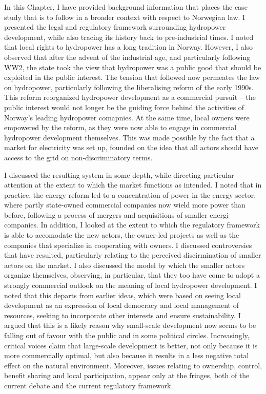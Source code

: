 In this Chapter, I have provided background information that places the case study that is to follow in a broader context with respect to Norwegian law. I presented the legal and regulatory framework surrounding hydropower development, while also tracing its history back to pre-industrial times. I noted that local rights to hydropower has a long tradition in Norway. However, I also observed that after the advent of the industrial age, and particularly following WW2, the state took the view that hydropower was a public good that should be exploited in the public interest. The tension that followed now permeates the law on hydropower, particularly following the liberalising reform of the early 1990s. This reform reorganized hydropower development as a commercial pursuit -- the public interest would not longer be the guiding force behind the activities of Norway's leading hydropower comapnies. At the same time, local owners were empowered by the reform, as they were now able to engage in commercial hydropower development themselves. This was made possible by the fact that a market for electricity was set up, founded on the idea that all actors should have access to the grid on non-discriminatory terms. 

I discussed the resulting system in some depth, while directing particular attention at the extent to which the market functions as intended. I noted that in practice, the energy reform led to a concentration of power in the energy sector, where partly state-owned commercial companies now wield more power than before, following a process of mergers and acquisitions of smaller energi companies. In addition, I looked at the extent to which the regulatory framework is able to accomodate the new actors, the owner-led projects as well as the companies that specialize in cooperating with owners. I discussed controversies that have resulted, particularly relating to the perceived discirmination of smaller actors on the market. I also discussed the model by which the smaller actors organize themselves, observing, in particular, that they too have come to adopt a strongly commercial outlook on the meaning of local hydropower development. I noted that this departs from earlier ideas, which were based on seeing local development as an expression of local democracy and local management of resources, seeking to incorporate other interests and ensure sustainability. I argued that this is a likely reason why small-scale development now seems to be falling out of favour with the public and in some political circles. Increasingly, critical voices claim that large-scale development is better, not only because it is more commercially optimal, but also because it results in a less negative total effect on the natural environment. Moreover, issues relating to ownership, control, benefit sharing and local participation, appear only at the fringes, both of the current debate and the current regulatory framework. 


